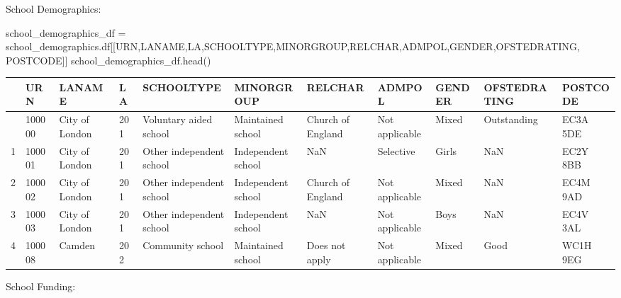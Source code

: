 \documentclass[
  letterpaper,
  DIV=11,
  numbers=noendperiod]{scrartcl}
\newenvironment{Shaded}{\begin{snugshade}}{\end{snugshade}}
\newcommand{\NormalTok}[1]{\textcolor[rgb]{0.00,0.23,0.31}{#1}}
\newcommand{\OperatorTok}[1]{\textcolor[rgb]{0.37,0.37,0.37}{#1}}
\newcommand{\StringTok}[1]{\textcolor[rgb]{0.13,0.47,0.30}{#1}}
\begin{document}
School Demographics:

\begin{Shaded}
\begin{Highlighting}[]
\NormalTok{school\_demographics\_df }\OperatorTok{=}\NormalTok{ school\_demographics.df[[}\StringTok{\textquotesingle{}URN\textquotesingle{}}\NormalTok{,}\StringTok{\textquotesingle{}LANAME\textquotesingle{}}\NormalTok{,}\StringTok{\textquotesingle{}LA\textquotesingle{}}\NormalTok{,}\StringTok{\textquotesingle{}SCHOOLTYPE\textquotesingle{}}\NormalTok{,}\StringTok{\textquotesingle{}MINORGROUP\textquotesingle{}}\NormalTok{,}\StringTok{\textquotesingle{}RELCHAR\textquotesingle{}}\NormalTok{,}\StringTok{\textquotesingle{}ADMPOL\textquotesingle{}}\NormalTok{,}\StringTok{\textquotesingle{}GENDER\textquotesingle{}}\NormalTok{,}\StringTok{\textquotesingle{}OFSTEDRATING\textquotesingle{}}\NormalTok{, }\StringTok{\textquotesingle{}POSTCODE\textquotesingle{}}\NormalTok{]]}
\NormalTok{school\_demographics\_df.head()}
\end{Highlighting}
\end{Shaded}

\begin{longtable}[]{@{}lllllllllll@{}}
\toprule\noalign{}
& URN & LANAME & LA & SCHOOLTYPE & MINORGROUP & RELCHAR & ADMPOL &
GENDER & OFSTEDRATING & POSTCODE \\
\midrule\noalign{}
\endhead
\bottomrule\noalign{}
\endlastfoot
0 & 100000 & City of London & 201 & Voluntary aided school & Maintained
school & Church of England & Not applicable & Mixed & Outstanding & EC3A
5DE \\
1 & 100001 & City of London & 201 & Other independent school &
Independent school & NaN & Selective & Girls & NaN & EC2Y 8BB \\
2 & 100002 & City of London & 201 & Other independent school &
Independent school & Church of England & Not applicable & Mixed & NaN &
EC4M 9AD \\
3 & 100003 & City of London & 201 & Other independent school &
Independent school & NaN & Not applicable & Boys & NaN & EC4V 3AL \\
4 & 100008 & Camden & 202 & Community school & Maintained school & Does
not apply & Not applicable & Mixed & Good & WC1H 9EG \\
\end{longtable}

School Funding:
\end{document}
